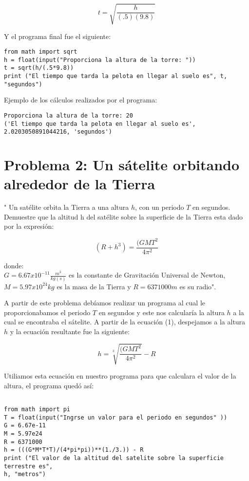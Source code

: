 \documentclass[12pt,letterpaper]{article}
\begin{document}
$$ t = \sqrt{\frac{h}{(.5)(9.8)}}$$

Y el programa final fue el siguiente: 

\begin{verbatim}
from math import sqrt
h = float(input("Proporciona la altura de la torre: "))
t = sqrt(h/(.5*9.8))
print ("El tiempo que tarda la pelota en llegar al suelo es", t, "segundos")
\end{verbatim}

Ejemplo de los cálculos realizados por el programa:

\begin{verbatim}
Proporciona la altura de la torre: 20
('El tiempo que tarda la pelota en llegar al suelo es', 
2.0203050891044216, 'segundos')
\end{verbatim}
 
\section{Problema 2: Un sátelite orbitando alrededor de la Tierra}

" Un satélite orbita la Tierra a una altura $h$, con un periodo $T$ en segundos.
Demuestre que la altitud h del satélite sobre la superficie de la Tierra esta dado por la expresión:
 
\begin{equation}
(R + h^3) = \frac{(GMT^2}{4\pi^2}
\end{equation} 
 
donde: \\ $ G = 6.67x10^{-11} \frac{m^3}{kg(s)}$ es la constante de Gravitación Universal de Newton, $ M = 5.97x10^{24} kg $ es la masa de la Tierra y $ R = 6371000 m $ es su radio". 

A partir de este problema debíamos realizar un programa al cual le proporcionabamos el periodo $T$ en segundos y este nos calcularía la altura $h$ a la cual se encontraba el sátelite. 
A partir de la ecuación (1), despejamos a la altura $h$ y la ecuación resultante fue la siguiente: 

\begin{equation}
h = \sqrt[3]{\frac{(GMT^2}{4\pi^2}} - R
\end{equation}

Utiliamos esta ecuación en nuestro programa para que calculara el valor de la altura, el programa quedó así:

\begin{verbatim}

from math import pi
T = float(input("Ingrse un valor para el periodo en segundos" ))
G = 6.67e-11
M = 5.97e24
R = 6371000
h = (((G*M*T*T)/(4*pi*pi))**(1./3.)) - R
print ("El valor de la altitud del satelite sobre la superficie terrestre es", 
h, "metros")

\end{verbatim}
\end{document}
